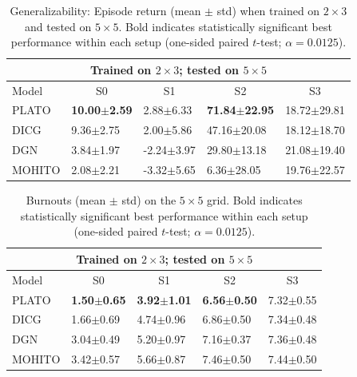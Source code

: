 \begin{table}[t]
\centering
\small
\setlength{\tabcolsep}{2.5pt}
\renewcommand{\arraystretch}{1.03}
\begin{tabular}{l|l|l|l|l}
\toprule
\multicolumn{5}{c}{Trained on $2\times 3$; tested on $5\times 5$} \\

\midrule
Model & \multicolumn{1}{c|}{S0} & \multicolumn{1}{c|}{S1} & \multicolumn{1}{c|}{S2} & \multicolumn{1}{c}{S3} \\
\midrule
PLATO & \textbf{10.00$\pm$2.59} & 2.88$\pm$6.33 & \textbf{71.84$\pm$22.95} & 18.72$\pm$29.81 \\
DICG & 9.36$\pm$2.75 & 2.00$\pm$5.86 & 47.16$\pm$20.08 & 18.12$\pm$18.70 \\
DGN & 3.84$\pm$1.97 & -2.24$\pm$3.97 & 29.80$\pm$13.18 & 21.08$\pm$19.40 \\
MOHITO  & 2.08$\pm$2.21 & -3.32$\pm$5.65 & 6.36$\pm$28.05 & 19.76$\pm$22.57 \\
\bottomrule
\end{tabular}
\caption{Generalizability: Episode return (mean $\pm$ std) when trained on $2\times 3$ and tested on $5\times 5$. Bold indicates statistically significant best performance within each setup (one-sided paired $t$-test; $\alpha=0.0125$).}
\label{tab:zs_reward_5x5}
\end{table}




\begin{table}[t]
\centering
\small
\setlength{\tabcolsep}{2.5pt}
\renewcommand{\arraystretch}{1.03}
\begin{tabular}{l|l|l|l|l}
\toprule
\multicolumn{5}{c}{Trained on $2\times 3$; tested on $5\times 5$} \\
\midrule
Model & \multicolumn{1}{c|}{S0} & \multicolumn{1}{c|}{S1} & \multicolumn{1}{c|}{S2} & \multicolumn{1}{c}{S3} \\
\midrule
PLATO & \textbf{1.50$\pm$0.65} & \textbf{3.92$\pm$1.01} & \textbf{6.56$\pm$0.50} & 7.32$\pm$0.55 \\
DICG & 1.66$\pm$0.69 & 4.74$\pm$0.96 & 6.86$\pm$0.50 & 7.34$\pm$0.48 \\
DGN & 3.04$\pm$0.49 & 5.20$\pm$0.97 & 7.16$\pm$0.37 & 7.36$\pm$0.48 \\
MOHITO  & 3.42$\pm$0.57 & 5.66$\pm$0.87 & 7.46$\pm$0.50 & 7.44$\pm$0.50 \\
\bottomrule
\end{tabular}
\caption{Burnouts (mean $\pm$ std) on the $5\times 5$ grid. Bold indicates statistically significant best performance within each setup (one-sided paired $t$-test; $\alpha=0.0125$).}
\label{tab:zs_burnouts_5x5}
\end{table}


